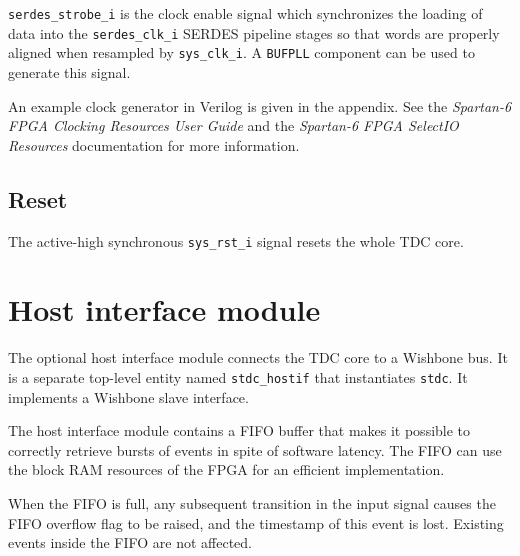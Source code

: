 \documentclass[a4paper,11pt]{article}
\begin{document}
\verb!serdes_strobe_i! is the clock enable signal which synchronizes the loading of data into the \verb!serdes_clk_i! SERDES pipeline stages so that words are properly aligned when resampled by \verb!sys_clk_i!. A \verb!BUFPLL! component can be used to generate this signal.

An example clock generator in Verilog is given in the appendix. See the \textit{Spartan-6 FPGA Clocking Resources User Guide} and the \textit{Spartan-6 FPGA SelectIO Resources} documentation for more information.

\subsection{Reset}
The active-high synchronous \verb!sys_rst_i! signal resets the whole TDC core.

\section{Host interface module}
The optional host interface module connects the TDC core to a Wishbone bus.
It is a separate top-level entity named \verb!stdc_hostif! that instantiates \verb!stdc!. It implements a Wishbone slave interface.

The host interface module contains a FIFO buffer that makes it possible to correctly retrieve bursts of events in spite of software latency.
The FIFO can use the block RAM resources of the FPGA for an efficient implementation.

When the FIFO is full, any subsequent transition in the input signal causes the FIFO overflow flag to be raised, and the timestamp of this event is lost. Existing events inside the FIFO are not affected.
\end{document}
